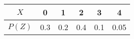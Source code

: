 \begin{tabular}{|c|c|c|c|c|c|} 
    \hline
    $X$ & 0 & 1 & 2 & 3 & 4 \\ 
    \hline
    $P(Z)$ & 0.3 & 0.2 & 0.4 & 0.1 & 0.05 \\ 
    \hline
    \end{tabular}
